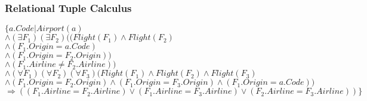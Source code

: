 \documentclass[a4paper,11pt,twoside]{article}
\begin{document}
\subsubsection*{Relational Tuple Calculus}
$\{a.Code|Airport (a)$\\
$\land (\exists F_1)(\exists F_2)((Flight(F_1) \land Flight(F_2)$\\
$ \land (F_1.Origin = a.Code)$\\
$ \land (F_1.Origin = F_2.Origin))$\\
$ \land (F_1.Airline \neq F_2.Airline))$\\ 
$ \land  (\forall F_1)(\forall F_2)(\forall F_3)(Flight(F_1) \land Flight(F_2) \land Flight(F_3)$\\
$ \land (F_1.Origin = F_2.Origin) \land (F_1.Origin = F_3.Origin) \land (F_1.Origin = a.Code))$\\
$ \Rightarrow ((F_1.Airline = F_2.Airline) \lor (F_1.Airline = F_3.Airline) \lor (F_2.Airline = F_3.Airline))\}$\\

%
\end{document}
